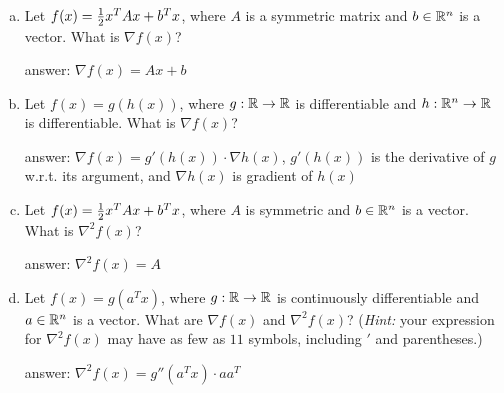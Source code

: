   \begin{enumerate}[(a)]
  \item \label{item:quadratic-gradient}
    Let $f(x) = \frac{1}{2} x^T A x + b^T x$, where $A$ is a symmetric matrix and
    $b \in \mathbb{R}^n$ is a vector. What is $\nabla f(x)$?

    answer: $\nabla f(x) = A x + b$

  \item \label{item:chain-rule}
    Let $f(x) = g(h(x))$, where $g : \mathbb{R} \to \mathbb{R}$ is
    differentiable and $h : \mathbb{R}^n \to \mathbb{R}$ is differentiable.
    What is $\nabla f(x)$?

    answer: $\nabla f(x) = g'(h(x)) \cdot \nabla h(x)$, $g'(h(x))$ is the derivative of $g$ w.r.t. its argument, and $\nabla h(x)$ is gradient of $h(x)$

  \item Let $f(x) = \frac{1}{2} x^T A x + b^T x$, where
    $A$ is symmetric and $b \in \mathbb{R}^n$ is a vector. What is
    $\nabla^2 f(x)$?

    answer: $\nabla^2 f(x) = A$

  \item Let $f(x) = g(a^T x)$, where $g : \mathbb{R} \to \mathbb{R}$ is continuously
    differentiable and $a \in \mathbb{R}^n$ is a vector.
    What are $\nabla f(x)$ and $\nabla^2 f(x)$?
    (\emph{Hint:} your expression for $\nabla^2 f(x)$ may have as few as
    $11$ symbols, including $'$ and parentheses.)

    answer: $\nabla^2 f(x) = g''(a^T x) \cdot aa^T$

  \end{enumerate}
